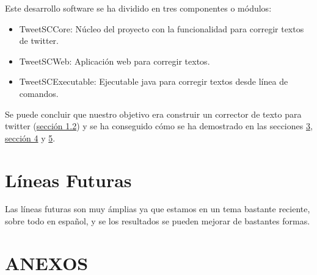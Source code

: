 \documentclass[spanish,12pt, a4paper,twoside]{paper}
\let\oldsection\section
\def\section{\cleardoublepage\oldsection}
\begin{document}
Este desarrollo software se ha dividido en tres componentes o módulos:
\begin{itemize}
	\item TweetSCCore: Núcleo del proyecto con la funcionalidad para corregir textos de twitter.
	\item TweetSCWeb: Aplicación web para corregir textos.
	\item TweetSCExecutable: Ejecutable java para corregir textos desde línea de comandos.
\end{itemize}
Se puede concluir que nuestro objetivo era construir un corrector de texto para twitter (\hyperref[sec:objetivos]{sección 1.2}) y se ha conseguido cómo se ha demostrado en las secciones \hyperref[sec:solucionpropuesta]{3}, \hyperref[sec:implementacion]{sección 4} y \hyperref[sec:implementacion]{5}.

\section{Líneas Futuras}\label{sec:lineasfuturas}
Las líneas futuras son muy ámplias ya que estamos en un tema bastante reciente, sobre todo en español, y se los resultados se pueden mejorar de bastantes formas.

\section*{ANEXOS}
\end{document}

